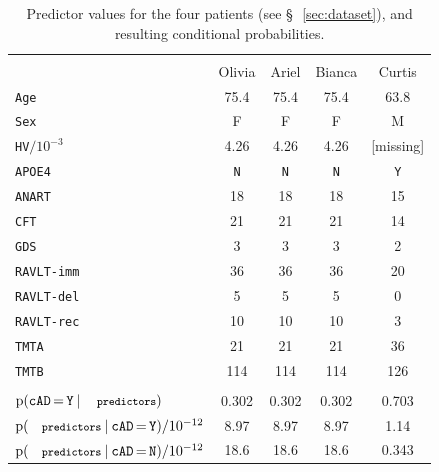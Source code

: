 \documentclass[utf8]{FrontiersinHarvard_mod} %
\newcommand*{\pencil}{{\fontencoding{U}\fontfamily{fontawesometwo}\selectfont\symbol{210}}}
\newcommand{\mynotep}[1]{{\color{notecolour}\pencil\ #1}}
\newcommand*{\mo}[1][=]{\mathord{\,#1\,}}
\newcommand*{\sect}{\S}%
\newcommand*{\p}{\mathrm{p}}%
\renewcommand*{\|}[1][]{\nonscript\:#1\vert\nonscript\:\mathopen{}}
\newcommand*{\age}{\texttt{Age}}
\newcommand*{\sex}{\texttt{Sex}}
\newcommand*{\apoe}{\texttt{APOE4}}
\newcommand*{\hv}{\texttt{HV}}
\newcommand*{\anart}{\texttt{ANART}}
\newcommand*{\cft}{\texttt{CFT}}
\newcommand*{\gds}{\texttt{GDS}}
\newcommand*{\ravltimm}{\texttt{RAVLT-imm}}
\newcommand*{\ravltdel}{\texttt{RAVLT-del}}
\newcommand*{\ravltrec}{\texttt{RAVLT-rec}}
\newcommand*{\tmta}{\texttt{TMTA}}
\newcommand*{\tmtb}{\texttt{TMTB}}
\newcommand*{\cad}{\texttt{cAD}}
\newcommand*{\yes}{\texttt{Y}}
\newcommand*{\no}{\texttt{N}}
\newcommand*{\predictors}{\texttt{\footnotesize predictors}}
\newcommand*{\ljm}{Ledley-Jaynes machine}
\begin{document}
\begin{table}[t]
  \centering
  \begin{tabular}[b]{lcccc}
    \hline\\[-1.5\jot]
    &{\small Olivia} &{\small Ariel} &{\small Bianca} &{\small Curtis}
    \\[2\jot]
    \age&75.4&75.4&75.4&63.8 \\
    \sex&F&F&F&M \\
    \hv${}/10^{-3}$&4.26&4.26&4.26&[missing] \\
    \apoe&\no&\no&\no&\yes \\
    \anart&18&18&18&15 \\
    \cft&21&21&21&14 \\
    \gds&3&3&3&2 \\
    \ravltimm &36&36&36&20 \\
    \ravltdel &5&5&5&0 \\
   \ravltrec &10&10&10&3 \\
    \tmta&21&21&21&36 \\
    \tmtb&114&114&114&126
    \\[\jot]
    \hline\\
    {\small $\p(\cad\mo\yes \| \predictors)$}&
    0.302&0.302&0.302&0.703
    \\
    {\small $\p(\predictors \| \cad\mo\yes)/10^{-12}$}&
    8.97&8.97&8.97&1.14
    \\
    {\small $\p(\predictors \| \cad\mo\no)/10^{-12}$}&
    18.6&18.6&18.6&0.343
    \\[\jot]
    \hline
  \end{tabular}\hfill
  \caption{Predictor values for the four patients (see \sect\,~\ref{sec:dataset}), and resulting conditional probabilities.}\label{tab:patients_data}
\end{table}
\end{document}
